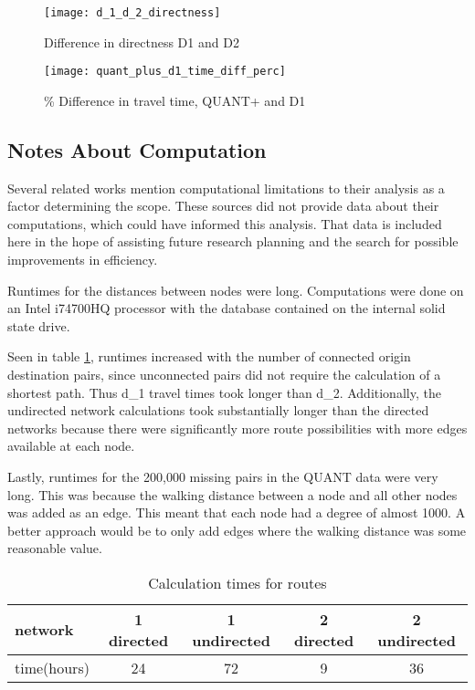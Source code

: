 \begin{figure}
\centering
\texttt{[image: d\_1\_d\_2\_directness]}
\caption{Difference in directness D1 and D2}
\label{fig:d1_d2_directness}
\end{figure}

\begin{figure}
\centering
\texttt{[image: quant\_plus\_d1\_time\_diff\_perc]}
\caption{\% Difference in travel time, QUANT+ and D1}
\label{fig:quant_d1_time}
\end{figure}

\subsection{Notes About Computation}

Several related works mention computational limitations to their analysis as a factor determining the scope. These sources did not provide data about their computations, which could have informed this analysis. That data is included here in the hope of assisting future research planning and the search for possible improvements in efficiency. 

Runtimes for the distances between nodes were long. Computations were done on an Intel i74700HQ processor with the database contained on the internal solid state drive. 

Seen in table \ref{table:net_calc_times}, runtimes increased with the number of connected origin destination pairs, since unconnected pairs  did not require the calculation of a shortest path. Thus d\_1 travel times took longer than d\_2. Additionally, the undirected network calculations took substantially longer than the directed networks because there were significantly more route possibilities with more edges available at each node. 

Lastly, runtimes for the 200,000 missing pairs in the QUANT data were very long. This was because the walking distance between a node and all other nodes was added as an edge. This meant that each node had a degree of almost 1000. A better approach would be to only add edges where the walking distance was some reasonable value. 




\begin{table}[]
\centering
\begin{tabular}{@{}lcccc@{}}
network     & 1 directed  & 1 undirected & 2 directed  & 2 undirected \\ 
\midrule
time(hours) & 24 & 72  & 9 & 36 \\ \bottomrule
\end{tabular}
\caption{Calculation times for routes}
\label{table:net_calc_times}
\end{table}

